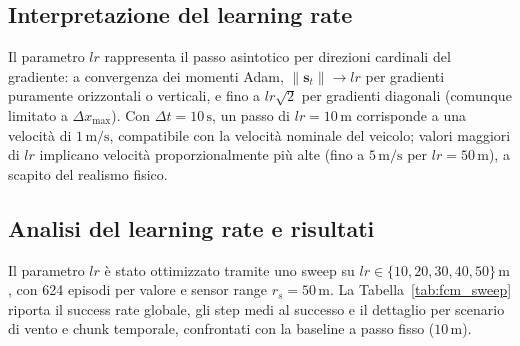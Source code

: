 \subsection{Interpretazione del learning rate}

Il parametro $lr$ rappresenta il passo asintotico per direzioni cardinali del
gradiente: a convergenza dei momenti Adam, $\|\mathbf{s}_t\| \to lr$ per gradienti
puramente orizzontali o verticali, e fino a $lr\sqrt{2}$ per gradienti diagonali
(comunque limitato a $\Delta x_{\max}$). Con $\Delta t = 10\,\text{s}$, un passo di
$lr = 10\,\text{m}$ corrisponde a una velocit\`a di $1\,\text{m/s}$, compatibile con la
velocit\`a nominale del veicolo; valori maggiori di $lr$ implicano velocit\`a
proporzionalmente pi\`u alte (fino a $5\,\text{m/s}$ per $lr = 50\,\text{m}$), a scapito
del realismo fisico.

\subsection{Analisi del learning rate e risultati}
\label{sec:fcm_lr}

Il parametro $lr$ \`e stato ottimizzato tramite uno sweep su
$lr \in \{10, 20, 30, 40, 50\}\,\text{m}$, con 624 episodi per valore e sensor range
$r_s = 50\,\text{m}$. La Tabella~\ref{tab:fcm_sweep} riporta il success rate globale, gli
step medi al successo e il dettaglio per scenario di vento e chunk temporale, confrontati
con la baseline a passo fisso ($10\,\text{m}$).

